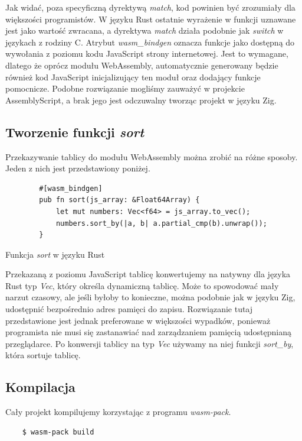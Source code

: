 \documentclass[language=polish,type=master]{aghmodern}
\begin{document}
Jak widać, poza specyficzną dyrektywą \emph{match}, kod powinien być zrozumiały dla większości programistów.
W języku Rust ostatnie wyrażenie w funkcji uznawane jest jako wartość zwracana, a dyrektywa \emph{match} działa podobnie jak \emph{switch} w językach z rodziny C.
Atrybut \emph{wasm\_bindgen} oznacza funkcje jako dostępną do wywołania z poziomu kodu JavaScript strony internetowej.
Jest to wymagane, dlatego że oprócz modułu WebAssembly, automatycznie generowany będzie również kod JavaScript inicjalizujący ten moduł oraz dodający funkcje pomocnicze.
Podobne rozwiązanie mogliśmy zauważyć w projekcie AssemblyScript, a brak jego jest odczuwalny tworząc projekt w języku Zig.

\subsection{Tworzenie funkcji \emph{sort}}
Przekazywanie tablicy do modułu WebAssembly można zrobić na różne sposoby.
Jeden z nich jest przedstawiony poniżej.

\begin{listing}[H]
    \begin{verbatim}
        #[wasm_bindgen]
        pub fn sort(js_array: &Float64Array) {
            let mut numbers: Vec<f64> = js_array.to_vec();
            numbers.sort_by(|a, b| a.partial_cmp(b).unwrap());
        }
    \end{verbatim}
    \caption{Funkcja \emph{sort} w języku Rust}
\end{listing}

Przekazaną z poziomu JavaScript tablicę konwertujemy na natywny dla języka Rust typ \emph{Vec}, który określa dynamiczną tablicę.
Może to spowodować mały narzut czasowy, ale jeśli byłoby to konieczne, można podobnie jak w języku Zig, udostępnić bezpośrednio adres pamięci do zapisu.
Rozwiązanie tutaj przedstawione jest jednak preferowane w większości wypadków, ponieważ programista nie musi się zastanawiać nad zarządzaniem pamięcią udostępnianą przeglądarce.
Po konwersji tablicy na typ \emph{Vec} używamy na niej funkcji \emph{sort\_by}, która sortuje tablicę.

\subsection{Kompilacja}
Cały projekt kompilujemy korzystając z programu \emph{wasm-pack}.

\begin{verbatim}
    $ wasm-pack build
\end{verbatim}
\end{document}
